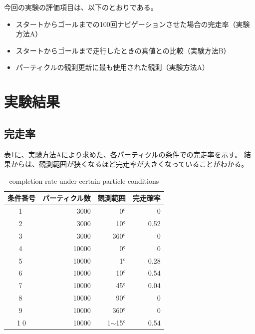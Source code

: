 \documentclass{jarticle}
\begin{document}
今回の実験の評価項目は、以下のとおりである。
\begin{itemize}
  \item スタートからゴールまでの100回ナビゲーションさせた場合の完走率（実験方法A）
  \item スタートからゴールまで走行したときの真値との比較（実験方法B）
  \item パーティクルの観測更新に最も使用された観測（実験方法A）
\end{itemize}

\section{実験結果}%

\subsection{完走率}

表\ref{table:完走率}に、実験方法Aにより求めた、各パーティクルの条件での完走率を示す。
結果からは、観測範囲が狭くなるほど完走率が大きくなっていることがわかる。

\begin{table}[htbp]
  \caption{completion rate under certain particle conditions}
  \label{table:完走率}
  \begin{tabular}{|c|r|r|r|} \hline
  条件番号 & パーティクル数 & 観測範囲  & 完走確率 \\ \hline \hline
  \textcircled{\scriptsize 1} & 3000 & 0° & 0 \\ \hline
  \textcircled{\scriptsize 2} & 3000 & 10° & 0.52 \\ \hline
  \textcircled{\scriptsize 3} & 3000 & 360° & 0 \\ \hline
  \textcircled{\scriptsize 4} & 10000 & 0° & 0 \\ \hline
  \textcircled{\scriptsize 5} & 10000 & 1° & 0.28 \\ \hline
  \textcircled{\scriptsize 6} & 10000 & 10° & 0.54 \\ \hline
  \textcircled{\scriptsize 7} & 10000 & 45° & 0.04 \\ \hline
  \textcircled{\scriptsize 8} & 10000 & 90° & 0 \\ \hline
  \textcircled{\scriptsize 9} & 10000 & 360° & 0 \\ \hline
  \textcircled{\scriptsize 10} & 10000 & 1$\sim$15° & 0.54 \\ \hline
  \end{tabular}
\end{table}
\end{document}
